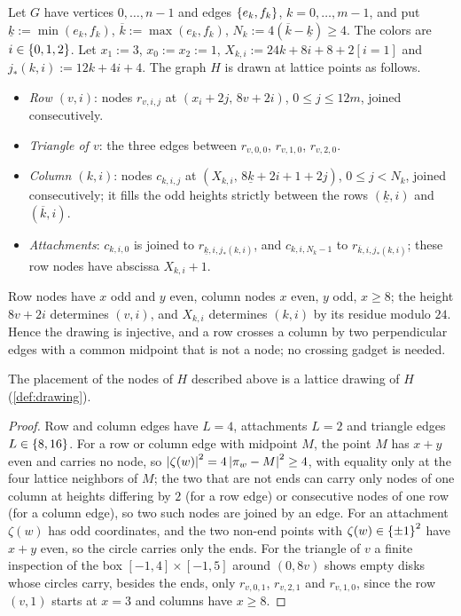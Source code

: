 Let $G$ have vertices $0,\dots,n-1$ and edges $\left\{ e_k,f_k \right\}$, $k=0,\dots,m-1$, and put $\underline k:=\min(e_k,f_k)$, $\overline k:=\max(e_k,f_k)$, $N_k:=4(\overline k-\underline k)\ge4$. The colors are $i\in\left\{ 0,1,2 \right\}$. Let $x_1:=3$, $x_0:=x_2:=1$, $X_{k,i}:=24k+8i+8+2[i=1]$ and $j_*(k,i):=12k+4i+4$. The graph $H$ is drawn at lattice points as follows.
\begin{itemize}
\item \emph{Row $(v,i)$}: nodes $r_{v,i,j}$ at $(x_i+2j,\,8v+2i)$, $0\le j\le12m$, joined consecutively.
\item \emph{Triangle of $v$}: the three edges between $r_{v,0,0}$, $r_{v,1,0}$, $r_{v,2,0}$.
\item \emph{Column $(k,i)$}: nodes $c_{k,i,j}$ at $(X_{k,i},\,8\underline k+2i+1+2j)$, $0\le j<N_k$, joined consecutively; it fills the odd heights strictly between the rows $(\underline k,i)$ and $(\overline k,i)$.
\item \emph{Attachments}: $c_{k,i,0}$ is joined to $r_{\underline k,i,j_*(k,i)}$, and $c_{k,i,N_k-1}$ to $r_{\overline k,i,j_*(k,i)}$; these row nodes have abscissa $X_{k,i}+1$.
\end{itemize}

Row nodes have $x$ odd and $y$ even, column nodes $x$ even, $y$ odd, $x\ge8$; the height $8v+2i$ determines $(v,i)$, and $X_{k,i}$ determines $(k,i)$ by its residue modulo $24$. Hence the drawing is injective, and a row crosses a column by two perpendicular edges with a common midpoint that is not a node; no crossing gadget is needed.

\begin{lemma}\label{lem:drawing}
The placement of the nodes of $H$ described above is a lattice drawing of $H$ (\cref{def:drawing}).
\end{lemma}

\begin{proof}
Row and column edges have $L=4$, attachments $L=2$ and triangle edges $L\in\left\{ 8,16 \right\}$. For a row or column edge with midpoint $M$, the point $M$ has $x+y$ even and carries no node, so $\left\lvert \zeta(w) \right\rvert^2=4\left\lvert \pi_w-M \right\rvert^2\ge4$, with equality only at the four lattice neighbors of $M$; the two that are not ends can carry only nodes of one column at heights differing by $2$ (for a row edge) or consecutive nodes of one row (for a column edge), so two such nodes are joined by an edge. For an attachment $\zeta(w)$ has odd coordinates, and the two non-end points with $\zeta(w)\in\left\{ \pm1 \right\}^2$ have $x+y$ even, so the circle carries only the ends. For the triangle of $v$ a finite inspection of the box $[-1,4]\times[-1,5]$ around $(0,8v)$ shows empty disks whose circles carry, besides the ends, only $r_{v,0,1}$, $r_{v,2,1}$ and $r_{v,1,0}$, since the row $(v,1)$ starts at $x=3$ and columns have $x\ge8$.
\end{proof}


